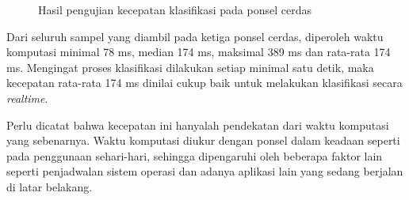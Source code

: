 \begin{figure}[h!]
    \caption{Hasil pengujian kecepatan klasifikasi pada ponsel cerdas}
    \label{gambar:hasil-kecepatan}
\end{figure}

Dari seluruh sampel yang diambil pada ketiga ponsel cerdas, diperoleh waktu komputasi minimal 78 ms, median 174 ms, maksimal 389 ms dan rata-rata 174 ms. Mengingat proses klasifikasi dilakukan setiap minimal satu detik, maka kecepatan rata-rata 174 ms dinilai cukup baik untuk melakukan klasifikasi secara \textit{realtime}.

Perlu dicatat bahwa kecepatan ini hanyalah pendekatan dari waktu komputasi yang sebenarnya. Waktu komputasi diukur dengan ponsel dalam keadaan seperti pada penggunaan sehari-hari, sehingga dipengaruhi oleh beberapa faktor lain seperti penjadwalan sistem operasi dan adanya aplikasi lain yang sedang berjalan di latar belakang.
